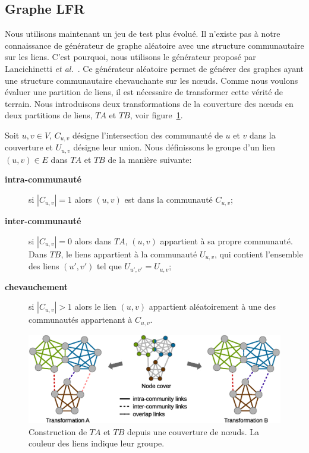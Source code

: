 \subsection{Graphe LFR}

Nous utilisons maintenant un jeu de test plus évolué.
Il n'existe pas à notre connaissance de générateur de graphe aléatoire avec une structure communautaire sur les liens.
C'est pourquoi, nous utilisons le générateur proposé par Lancichinetti \textit{et al.}~\cite{Lancichinetti2009b}.
Ce générateur aléatoire permet de générer des graphes ayant une structure communautaire chevauchante sur les n\oe uds.
Comme nous voulons évaluer une partition de liens, il est nécessaire de transformer cette vérité de terrain.
Nous introduisons deux transformations de la couverture des n\oe uds en deux partitions de liens, $TA$ et $TB$, voir figure~\ref{fig:Trans}.

Soit $u,v \in V$, $C_{u,v}$ désigne l'intersection des communauté de $u$ et $v$ dans la couverture et $U_{u,v}$ désigne leur union.
Nous définissons le groupe d'un lien $(u,v) \in E$ dans $TA$ et $TB$ de la manière suivante:
\begin{description}
\item[\textbf{intra-communauté}] si $|C_{u,v}| = 1$ alors $(u,v)$ est dans la communauté $C_{u,v}$;
\item[\textbf{inter-communauté}] si $|C_{u,v}| = 0$ alors dans $TA$, $(u,v)$ appartient à sa propre communauté.
Dans $TB$, le liens appartient à la communauté $U_{u,v}$, qui contient l'ensemble des liens $(u',v')$ tel que $U_{u',v'}=U_{u,v}$;
\item[\textbf{chevauchement}] si $|C_{u,v}| > 1$ alors le lien $(u,v)$ appartient aléatoirement à une des communautés appartenant à $C_{u,v}$.
\end{description}

\begin{figure}
\centering
\includegraphics[width=0.9\linewidth]{img/ExpectedNodes/Example/GroundTruthTransformation}
\caption{Construction de $TA$ et $TB$ depuis une couverture de n\oe uds.
La couleur des liens indique leur groupe.}
\label{fig:Trans}
\end{figure}

